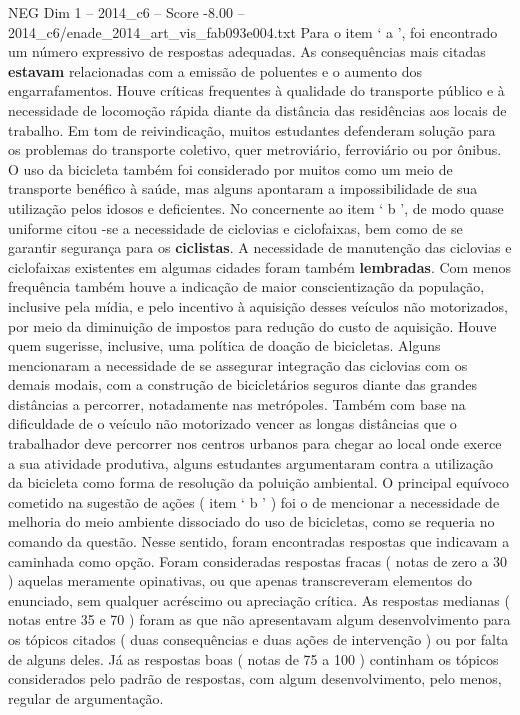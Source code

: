 \begin{textsample}{NEG Dim 1 – 2014\_c6 – Score -8.00 – 2014\_c6/enade\_2014\_art\_vis\_fab093e004.txt}
Para o item ‘ a ’, foi encontrado um número expressivo de respostas adequadas.
As consequências mais citadas \textbf{estavam} relacionadas com a emissão de poluentes e o aumento dos engarrafamentos.
Houve críticas frequentes à qualidade do transporte público e à necessidade de locomoção rápida diante da distância das residências aos locais de trabalho.
Em tom de reivindicação, muitos estudantes defenderam solução para os problemas do transporte coletivo, quer metroviário, ferroviário ou por ônibus.
O uso da bicicleta também foi considerado por muitos como um meio de transporte benéfico à saúde, mas alguns apontaram a impossibilidade de sua utilização pelos idosos e deficientes.
No concernente ao item ‘ b ’, de modo quase uniforme citou -se a necessidade de ciclovias e ciclofaixas, bem como de se garantir segurança para os \textbf{ciclistas}.
A necessidade de manutenção das ciclovias e ciclofaixas existentes em algumas cidades foram também \textbf{lembradas}.
Com menos frequência também houve a indicação de maior conscientização da população, inclusive pela mídia, e pelo incentivo à aquisição desses veículos não motorizados, por meio da diminuição de impostos para redução do custo de aquisição.
Houve quem sugerisse, inclusive, uma política de doação de bicicletas.
Alguns mencionaram a necessidade de se assegurar integração das ciclovias com os demais modais, com a construção de bicicletários seguros diante das grandes distâncias a percorrer, notadamente nas metrópoles.
Também com base na dificuldade de o veículo não motorizado vencer as longas distâncias que o trabalhador deve percorrer nos centros urbanos para chegar ao local onde exerce a sua atividade produtiva, alguns estudantes argumentaram contra a utilização da bicicleta como forma de resolução da poluição ambiental.
O principal equívoco cometido na sugestão de ações ( item ‘ b ’ ) foi o de mencionar a necessidade de melhoria do meio ambiente dissociado do uso de bicicletas, como se requeria no comando da questão.
Nesse sentido, foram encontradas respostas que indicavam a caminhada como opção.
Foram consideradas respostas fracas ( notas de zero a 30 ) aquelas meramente opinativas, ou que apenas transcreveram elementos do enunciado, sem qualquer acréscimo ou apreciação crítica.
As respostas medianas ( notas entre 35 e 70 ) foram as que não apresentavam algum desenvolvimento para os tópicos citados ( duas consequências e duas ações de intervenção ) ou por falta de alguns deles.
Já as respostas boas ( notas de 75 a 100 ) continham os tópicos considerados pelo padrão de respostas, com algum desenvolvimento, pelo menos, regular de argumentação.

\end{textsample}

